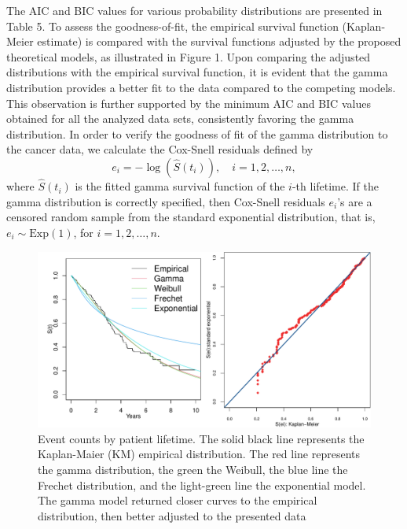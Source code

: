 \documentclass[]{interact}
\theoremstyle{plain}%
\theoremstyle{definition}
\theoremstyle{remark}
\begin{document}
The AIC and BIC values for various probability distributions are presented in Table 5. To assess the goodness-of-fit, the empirical survival function (Kaplan-Meier estimate) is compared with the survival functions adjusted by the proposed theoretical models, as illustrated in Figure 1. Upon comparing the adjusted distributions with the empirical survival function, it is evident that the gamma distribution provides a better fit to the data compared to the competing models. This observation is further supported by the minimum AIC and BIC values obtained for all the analyzed data sets, consistently favoring the gamma distribution. In order to verify the goodness of fit of the gamma distribution to the cancer data, we calculate the Cox-Snell residuals \citep{cox1968} defined by
\begin{equation*}
    e_i=-\log \left(\hat S(t_i)\right),\quad  i=1,2,\ldots,n,
\end{equation*}
where $\hat S(t_i)$ is the fitted gamma survival function of the $i$-th lifetime.  If the gamma distribution  is correctly specified, then Cox-Snell residuals $e_i$'s are a censored random sample from the standard exponential distribution, that is, $e_i\sim \text{Exp}(1)$, for $i=1,2,\ldots,n$.

\begin{figure}[!h] 
	\centering
	\includegraphics[scale=0.50]{survival.pdf}
	\caption{Event counts by patient lifetime. The solid
black line represents the Kaplan-Maier (KM) empirical distribution. The red line
represents the gamma distribution, the green the Weibull, the blue line the Frechet distribution, and the light-green line the exponential model. The
gamma model returned closer curves to the empirical distribution, then better adjusted to the
presented data}\label{grafico-obscajust1}
\end{figure}
\end{document}
